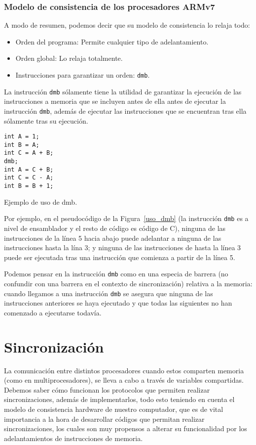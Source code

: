 \subsubsection{Modelo de consistencia de los procesadores ARMv7}
A modo de resumen, podemos decir que su modelo de consistencia lo relaja todo:
\begin{itemize}
    \item Orden del programa: Permite cualquier tipo de adelantamiento.
    \item Orden global: Lo relaja totalmente.
    \item Instrucciones para garantizar un orden: \verb|dmb|.
\end{itemize}
La instrucción \verb|dmb| sólamente tiene la utilidad de garantizar la ejecución de las instrucciones a memoria que se incluyen antes de ella antes de ejecutar la instrucción \verb|dmb|, además de ejecutar las instrucciones que se encuentran tras ella sólamente tras su ejecución.
\begin{listing}[H]
\centering
\begin{verbatim}
int A = 1;
int B = A;
int C = A + B;
dmb;
int A = C + B;
int C = C - A;
int B = B + 1;
\end{verbatim}
\caption{Ejemplo de uso de dmb.}
\label{uso_dmb}
\end{listing}
Por ejemplo, en el pseudocódigo de la Figura~\ref{uso_dmb} (la instrucción \verb|dmb| es a nivel de ensamblador y el resto de código es código de C), ninguna de las instrucciones de la línea 5 hacia abajo puede adelantar a ninguna de las instrucciones hasta la lína 3; y ninguna de las instrucciones de hasta la línea 3 puede ser ejecutada tras una instrucción que comienza a partir de la línea 5.

Podemos pensar en la instrucción \verb|dmb| como en una especia de barrera (no confundir con una barrera en el contexto de sincronización) relativa a la memoria: cuando llegamos a una instrucción \verb|dmb| se asegura que ninguna de las instrucciones anteriores se haya ejecutado y que todas las siguientes no han comenzado a ejecutarse todavía.


\newpage
\section{Sincronización}
La comunicación entre distintos procesadores cuando estos comparten memoria (como en multiprocesadores), se lleva a cabo a través de variables compartidas. Debemos saber cómo funcionan los protocolos que permiten realizar sincronizaciones, además de implementarlos, todo esto teniendo en cuenta el modelo de consistencia hardware de nuestro computador, que es de vital importancia a la hora de desarrollar códigos que permitan realizar sincronizaciones, los cuales son muy propensos a alterar su funcionalidad por los adelantamientos de instrucciones de memoria.

